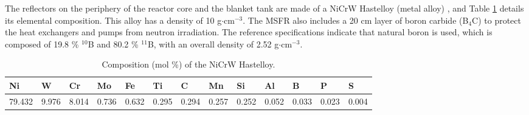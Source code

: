 The reflectors on the periphery of the reactor core and the blanket tank are
made of a NiCrW Hastelloy (metal alloy) \cite{brovchenko_neutronic_2019}, and
Table \ref{table:refl} details its elemental composition. This alloy has a
density of 10 g$\cdot$cm$^{-3}$. The \gls{MSFR} also includes a 20 cm
layer of boron carbide (B$_4$C) to protect the heat exchangers and pumps from
neutron irradiation. The reference specifications indicate that natural boron
is used, which is composed of 19.8 \% $^{10}$B and 80.2 \% $^{11}$B, with an
overall density of 2.52 g$\cdot$cm$^{-3}$. 
%
\begin{table}[htb!]
\footnotesize
\centering
\caption{Composition (mol \%) of the NiCrW Hastelloy.}
\begin{tabular}{l l l l l l l l l l l l l}
\toprule
Ni & W & Cr & Mo & Fe & Ti & C & Mn & Si & Al & B & P & S \\
\midrule
79.432 & 9.976 & 8.014 & 0.736 & 0.632 & 0.295 & 0.294 & 0.257 & 0.252 & 0.052 & 0.033 & 0.023 & 0.004 \\
\bottomrule
\end{tabular}
\label{table:refl}
\end{table}
